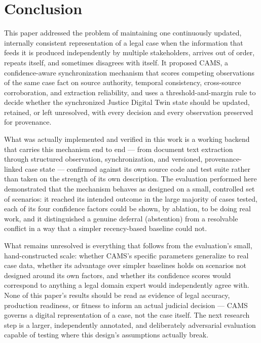 \documentclass[conference]{IEEEtran}
\begin{document}
\section{Conclusion}

This paper addressed the problem of maintaining one continuously updated,
internally consistent representation of a legal case when the information
that feeds it is produced independently by multiple stakeholders, arrives
out of order, repeats itself, and sometimes disagrees with itself. It
proposed CAMS, a confidence-aware synchronization mechanism that scores
competing observations of the same case fact on source authority, temporal
consistency, cross-source corroboration, and extraction reliability, and
uses a threshold-and-margin rule to decide whether the synchronized Justice
Digital Twin state should be updated, retained, or left unresolved, with
every decision and every observation preserved for provenance.

What was actually implemented and verified in this work is a working
backend that carries this mechanism end to end --- from document text
extraction through structured observation, synchronization, and versioned,
provenance-linked case state --- confirmed against its own source code and
test suite rather than taken on the strength of its own description. The
evaluation performed here demonstrated that the mechanism behaves as
designed on a small, controlled set of scenarios: it reached its intended
outcome in the large majority of cases tested, each of its four confidence
factors could be shown, by ablation, to be doing real work, and it
distinguished a genuine deferral (abstention) from a resolvable conflict in
a way that a simpler recency-based baseline could not.

What remains unresolved is everything that follows from the evaluation's
small, hand-constructed scale: whether CAMS's specific parameters
generalize to real case data, whether its advantage over simpler baselines
holds on scenarios not designed around its own factors, and whether its
confidence scores would correspond to anything a legal domain expert would
independently agree with. None of this paper's results should be read as
evidence of legal accuracy, production readiness, or fitness to inform an
actual judicial decision --- CAMS governs a digital representation of a
case, not the case itself. The next research step is a larger,
independently annotated, and deliberately adversarial evaluation capable of
testing where this design's assumptions actually break.
\end{document}
